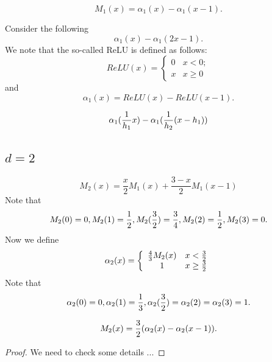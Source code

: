 \begin{lemma}
  \begin{equation}
    \label{M1a1}
M_1(x)=\alpha_1(x)-\alpha_1(x-1). 
  \end{equation}
\end{lemma}
Consider the following
$$
\alpha_1(x)-\alpha_1(2x-1). 
$$
We note that the so-called ReLU is defined as follows:
\begin{equation}
  \label{ReLU}
ReLU(x)= 
\left\{
\begin{array}{cl}
0 & x<0; \\
x & x\ge 0
  \end{array}
\right.
\end{equation}
and
\begin{equation}
\alpha_1(x)=ReLU(x)-ReLU(x-1).
\end{equation}

\begin{equation}
\alpha_1({1 \over h_1} x) - \alpha_1({1 \over h_2} (x - h_1) )
\end{equation}




\newpage
\subsection{$d=2$}
\begin{equation}
  \label{M2}
M_2(x)=\frac{x}{2}M_{1}(x)  + \frac{3-x}{2}M_{1}(x-1)   
\end{equation}
Note that
$$
M_2(0)=0, M_2(1)={1\over 2}, M_2({3\over2})={3\over 4},
M_2(2)={1\over2}, M_2(3)=0.
$$
Now we define
\begin{equation}
  \label{a2}
\alpha_2(x)= 
\left\{
\begin{array}{cl}
{4\over3}M_2(x) &  x < {3\over 2}\\
1 & x\ge {3\over2}
  \end{array}
\right.
\end{equation} 
Note that
$$
\alpha_2(0)=0, \alpha_2(1)={1\over 3}, \alpha_2({3\over2})=\alpha_2(2)=\alpha_2(3)=1.
$$
\begin{lemma}
 \begin{equation}
    \label{M2a2}
M_2(x)={3\over 2}(\alpha_2(x)-\alpha_2(x-1)).
  \end{equation}  
\end{lemma}
\begin{proof}
 We need to check some details ...
\end{proof}

